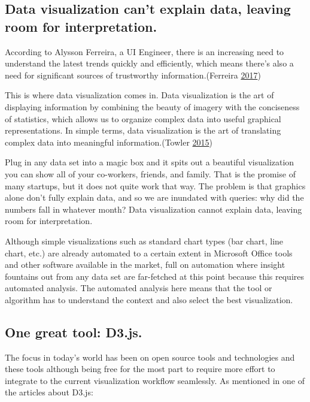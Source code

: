\documentclass[]{book}
\begin{document}
\subsection{Data visualization can't explain data, leaving room for
interpretation.}\label{data-visualization-cant-explain-data-leaving-room-for-interpretation.}

According to Alysson Ferreira, a UI Engineer, there is an increasing
need to understand the latest trends quickly and efficiently, which
means there's also a need for significant sources of trustworthy
information.(Ferreira \protect\hyperlink{ref-UI_engineer}{2017})

This is where data visualization comes in. Data visualization is the art
of displaying information by combining the beauty of imagery with the
conciseness of statistics, which allows us to organize complex data into
useful graphical representations. In simple terms, data visualization is
the art of translating complex data into meaningful information.(Towler
\protect\hyperlink{ref-future_viz}{2015})

Plug in any data set into a magic box and it spits out a beautiful
visualization you can show all of your co-workers, friends, and family.
That is the promise of many startups, but it does not quite work that
way. The problem is that graphics alone don't fully explain data, and so
we are inundated with queries: why did the numbers fall in whatever
month? Data visualization cannot explain data, leaving room for
interpretation.

Although simple visualizations such as standard chart types (bar chart,
line chart, etc.) are already automated to a certain extent in Microsoft
Office tools and other software available in the market, full on
automation where insight fountains out from any data set are far-fetched
at this point because this requires automated analysis. The automated
analysis here means that the tool or algorithm has to understand the
context and also select the best visualization.

\subsection{One great tool: D3.js.}\label{one-great-tool-d3.js.}

The focus in today's world has been on open source tools and
technologies and these tools although being free for the most part to
require more effort to integrate to the current visualization workflow
seamlessly. As mentioned in one of the articles about D3.js:
\end{document}

